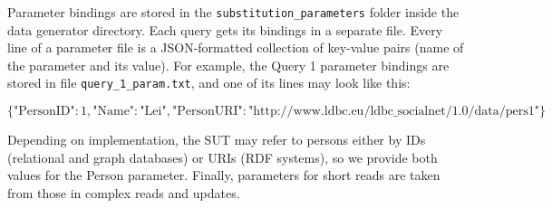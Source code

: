 Parameter bindings are stored in the \texttt{substitution\_parameters} folder
inside the data generator directory. Each query gets its bindings in a separate
file. Every line of a parameter file is a JSON-formatted collection of
key-value pairs (name of the parameter and its value). For example, the Query 1
parameter bindings are stored in file \texttt{query\_1\_param.txt}, and one of
its lines may look like this:

\vspace{-6mm}
$$
\{\text{"PersonID"}: 1, \text{"Name"}: \text{"Lei"}, \text{"PersonURI"}: \text{"http://www.ldbc.eu/ldbc\_socialnet/1.0/data/pers1"}\}
$$

Depending on implementation, the SUT may refer to persons either by IDs
(relational and graph databases) or URIs (RDF systems), so we provide both
values for the Person parameter.  Finally, parameters for short reads are taken
from those in complex reads and updates.
